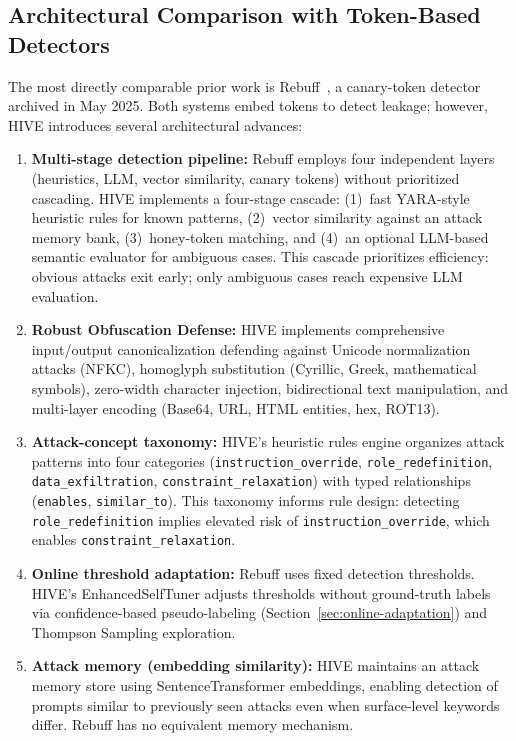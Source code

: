 \documentclass[manuscript,screen,review]{acmart}
\begin{document}
\subsection{Architectural Comparison with Token-Based Detectors}
The most directly comparable prior work is Rebuff~\cite{b13}, a canary-token detector archived in May 2025. Both systems embed tokens to detect leakage; however, HIVE introduces several architectural advances:

\begin{enumerate}
\item \textbf{Multi-stage detection pipeline:} Rebuff employs four independent layers (heuristics, LLM, vector similarity, canary tokens) without prioritized cascading. HIVE implements a four-stage cascade: (1)~fast YARA-style heuristic rules for known patterns, (2)~vector similarity against an attack memory bank, (3)~honey-token matching, and (4)~an optional LLM-based semantic evaluator for ambiguous cases. This cascade prioritizes efficiency: obvious attacks exit early; only ambiguous cases reach expensive LLM evaluation.

\item \textbf{Robust Obfuscation Defense:} HIVE implements comprehensive input/output canonicalization defending against Unicode normalization attacks (NFKC), homoglyph substitution (Cyrillic, Greek, mathematical symbols), zero-width character injection, bidirectional text manipulation, and multi-layer encoding (Base64, URL, HTML entities, hex, ROT13).


\item \textbf{Attack-concept taxonomy:} HIVE's heuristic rules engine organizes attack patterns into four categories (\texttt{instruction\_override}, \texttt{role\_redefinition}, \texttt{data\_exfiltration}, \texttt{constraint\_relaxation}) with typed relationships (\texttt{enables}, \texttt{similar\_to}). This taxonomy informs rule design: detecting \texttt{role\_redefinition} implies elevated risk of \texttt{instruction\_override}, which enables \texttt{constraint\_relaxation}.

\item \textbf{Online threshold adaptation:} Rebuff uses fixed detection thresholds. HIVE's EnhancedSelfTuner adjusts thresholds without ground-truth labels via confidence-based pseudo-labeling (Section~\ref{sec:online-adaptation}) and Thompson Sampling exploration.

\item \textbf{Attack memory (embedding similarity):} HIVE maintains an attack memory store using SentenceTransformer embeddings, enabling detection of prompts similar to previously seen attacks even when surface-level keywords differ. Rebuff has no equivalent memory mechanism.
\end{enumerate}
\end{document}
